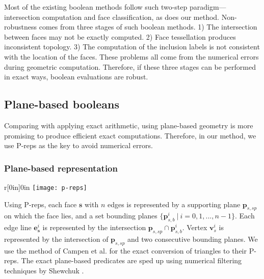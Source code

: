 Most of the existing boolean methods follow such two-step paradigm---intersection computation and face classification, as does our method. Non-robustness comes from three stages of such boolean methods. 1) The intersection between faces may not be exactly computed. 2) Face tessellation produces inconsistent topology. 3) The computation of the inclusion labels is not consistent with the location of the faces. These problems all come from the numerical errors during geometric computation. Therefore, if these three stages can be performed in exact ways, boolean evaluations are robust.



\subsection{Plane-based booleans}
Comparing with applying exact arithmetic, using plane-based geometry \cite{campen2010exact} is more promising to produce efficient exact computations. Therefore, in our method, we use P-reps as the key to avoid numerical errors.

\label{sec:substrates}
\subsubsection{Plane-based representation}


\begin{wrapfigure}{r}[0in]{0in}
\texttt{[image: p-reps]}
\end{wrapfigure}

Using P-reps, each face $\bm{s}$ with $n$ edges is represented by a supporting plane $\bm{p}_{s,sp}$ on which the face lies, and a set bounding planes $\{\bm{p}_{s,b}^i \ \vert\  i = 0, 1,...,n-1\}$. Each edge line $\bm{e}_{\bm{s}}^i$ is represented by the intersection $\bm{p}_{s,sp} \cap \bm{p}_{s,b}^i$.
Vertex $\bm{v}_s^i$ is represented by the intersection of $\bm{p}_{s,sp}$ and two consecutive bounding planes. We use the method of Campen et al. \cite{campen2010exact} for the exact conversion of triangles to their P-reps. The exact plane-based predicates are sped up using numerical filtering techniques by Shewchuk \cite{shewchuk1997adaptive}.



